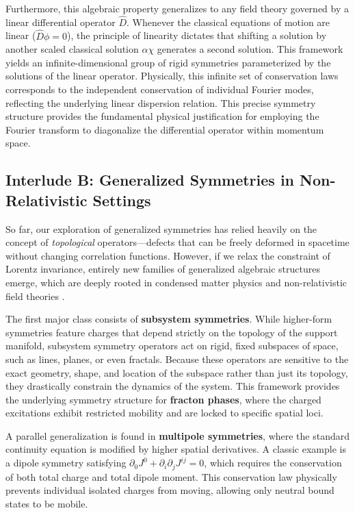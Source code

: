 \documentclass[aps,preprint,nofootinbib,preprintnumbers,eqsecnum,superscriptaddress]{revtex4}
\numberwithin{equation}{section}
\begin{document}
Furthermore, this algebraic property generalizes to any field theory governed by a linear differential operator $\hat{D}$. Whenever the classical equations of motion are linear ($\hat{D}\phi = 0$), the principle of linearity dictates that shifting a solution by another scaled classical solution $\alpha \chi$ generates a second solution. This framework yields an infinite-dimensional group of rigid symmetries parameterized by the solutions of the linear operator. Physically, this infinite set of conservation laws corresponds to the independent conservation of individual Fourier modes, reflecting the underlying linear dispersion relation. This precise symmetry structure provides the fundamental physical justification for employing the Fourier transform to diagonalize the differential operator within momentum space.

\subsection{Interlude B: Generalized Symmetries in Non-Relativistic Settings}\label{section:non_relativistic_symmetries}

So far, our exploration of generalized symmetries has relied heavily on the concept of \textit{topological} operators—defects that can be freely deformed in spacetime without changing correlation functions. However, if we relax the constraint of Lorentz invariance, entirely new families of generalized algebraic structures emerge, which are deeply rooted in condensed matter physics and non-relativistic field theories \cite{cordova2022snowmasswhitepapergeneralized, McGreevy_2023}.

The first major class consists of \textbf{subsystem symmetries}. While higher-form symmetries feature charges that depend strictly on the topology of the support manifold, subsystem symmetry operators act on rigid, fixed subspaces of space, such as lines, planes, or even fractals. Because these operators are sensitive to the exact geometry, shape, and location of the subspace rather than just its topology, they drastically constrain the dynamics of the system. This framework provides the underlying symmetry structure for \textbf{fracton phases}, where the charged excitations exhibit restricted mobility and are locked to specific spatial loci.

A parallel generalization is found in \textbf{multipole symmetries}, where the standard continuity equation is modified by higher spatial derivatives. A classic example is a dipole symmetry satisfying $\partial_0 J^0 + \partial_i \partial_j J^{ij} = 0$, which requires the conservation of both total charge and total dipole moment. This conservation law physically prevents individual isolated charges from moving, allowing only neutral bound states to be mobile. 
\end{document}
